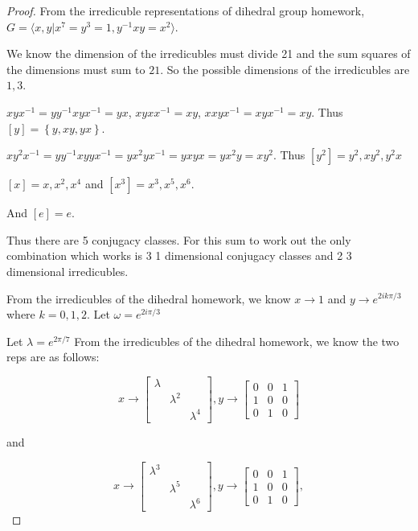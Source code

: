 \documentclass{article}
\newcommand{\angles}[1]{\langle #1 \rangle}
\begin{document}
\begin{proof}
    From the irredicuble representations of dihedral group homework, $G = \angles{x, y | x^7 = y^3 = 1, y^{-1}xy = x^2}$.
    
    We know the dimension of the irredicubles must divide 21 and the sum squares of the dimensions must sum to $21$. So the possible dimensions of the irredicubles are $1, 3$.   

    $xyx^{-1}= y y^{-1} x y x^{-1} = y x$, $xyxx^{-1} = xy$, $x x y x^{-1} = x y x^{-1} = xy$. Thus $[y] = \left\{ y, xy, yx \right\}$. 
    
    $xy^2x^{-1} = y y^{-1} x y y x^{-1} = y x^2 y x^{-1} = y x y x = y x^2 y = x y^2$. Thus $[y^2] = y^2, xy^2, y^2x$  
    
    $[x] = x, x^2, x^4$ and $[x^3] = x^3, x^5, x^{6}$.

    And $[e] = e$. 

    Thus there are 5 conjugacy classes. For this sum to work out the only combination which works is 3 1 dimensional conjugacy classes and 2 3 dimensional irredicubles. 

    From the irredicubles of the dihedral homework, we know $x \to 1$ and $y \to e^{2 i k \pi /3}$ where $k = 0, 1, 2$. Let $\omega = e^{2 i \pi /3}$ 


    Let $\lambda = e^{2 \pi / 7}$ 
    From the irredicubles of the dihedral homework, we know the two reps are as follows:
    

    \[
        x \to \begin{bmatrix}
            \lambda \\  & \lambda^{2} \\  & & \lambda^{4}
        \end{bmatrix}, y \to \begin{bmatrix}
            0 & 0 & 1 \\ 1 & 0 & 0 \\  0 & 1 & 0
        \end{bmatrix} 
    \] 

    and 

    \[
        x \to \begin{bmatrix}
            \lambda^3 \\  & \lambda^{5} \\  & & \lambda^{6}
        \end{bmatrix}, y \to \begin{bmatrix}
            0 & 0 & 1 \\ 1 & 0 & 0 \\  0 & 1 & 0
        \end{bmatrix},
    \]
    

\end{proof}
\end{document}
